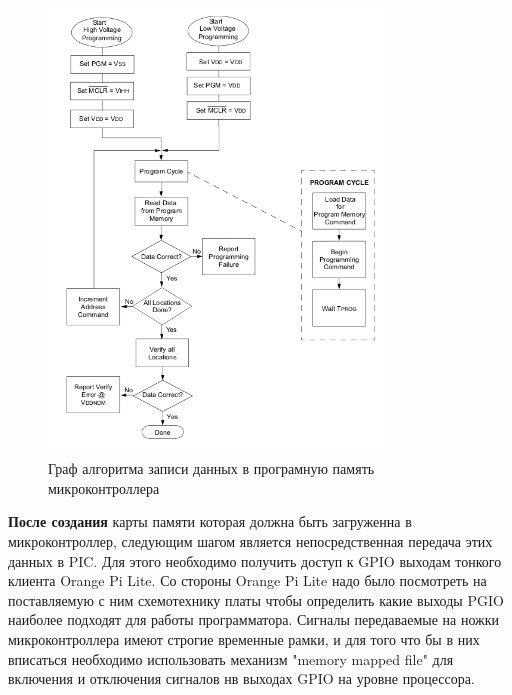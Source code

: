 \begin{figure}[h!]
    \centering
    \includegraphics[width=0.8\textwidth]{2017-05-08_at_03:42:09_screenshot.png}
    \caption{Граф алгоритма записи данных в програмную память микроконтроллера}
\end{figure}


\textbf{После создания} карты памяти которая должна быть загруженна в микроконтроллер, следующим 
шагом является непосредственная передача этих данных в PIC. Для этого необходимо получить доступ 
к GPIO выходам тонкого клиента Orange Pi Lite. Со стороны Orange Pi Lite надо было посмотреть на 
поставляемую с ним схемотехнику платы чтобы определить какие выходы PGIO наиболее подходят для работы программатора.
Сигналы передаваемые на ножки микроконтроллера имеют строгие временные рамки, и для того что бы в них вписаться необходимо 
использовать механизм "memory mapped file" для включения и отключения сигналов нв выходах GPIO на уровне процессора.

